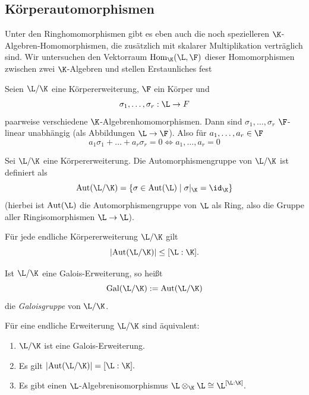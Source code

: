 \documentclass[11pt, a4paper]{article}
\begin{document}
\subsection{Körperautomorphismen}

\begin{note}
    Unter den Ringhomomorphismen gibt es eben auch die noch spezielleren $\K$-Algebren-Homomorphismen, die zusätzlich mit skalarer Multiplikation verträglich sind. Wir untersuchen den Vektorraum $\mathrm{Hom}_\K(\L,\F)$ dieser Homomorphismen zwischen zwei $\K$-Algebren und stellen Erstaunliches fest
\end{note}

\begin{lemma}[Artin] \Theorem
    Seien $\L/\K$ eine Körpererweiterung, $\F$ ein Körper und
    $$\sigma_1, \dots, \sigma_r: \L \to F$$
    paarweise verschiedene $\K$-Algebrenhomomorphismen. Dann sind $\sigma_1,\dots,\sigma_r$ $\F$-linear unabhängig (als Abbildungen $\L\to \F$). Also für $a_1,\dots , a_r\in \F$
    $$a_1\sigma_1+\dots +a_r\sigma_r = 0 \iff a_1,\dots , a_r=0 $$
\end{lemma}

\begin{definition}[Automorphismengruppe] \Theorem
    Sei $\L/\K$ eine Körpererweiterung. Die Automorphismengruppe von $\L/\K$ ist definiert als
    $$\mathrm{Aut}(\L/\K) = \{\sigma \in \mathrm{Aut}(\L) \mid \sigma|_\K = \id_\K\}$$
    (hierbei ist $\mathrm{Aut}(\L)$ die Automorphismengruppe von $\L$ als Ring, also die Gruppe aller Ringisomorphismen $\L \to \L$).
\end{definition}

\begin{corollary}
    Für jede endliche Körpererweiterung $\L/\K$ gilt
    $$|\mathrm{Aut}(\L/\K)| \leq [\L:\K].$$
\end{corollary}


\begin{definition}[Galoisgruppe] \Theorem
    Ist $\L/\K$ eine Galois-Erweiterung, so heißt
    $$\mathrm{Gal}(\L/\K) := \mathrm{Aut}(\L/\K)$$
    die \emph{Galoisgruppe} von $\L/\K$.
\end{definition}

\begin{theorem} \Theorem
    Für eine endliche Erweiterung $\L/\K$ sind äquivalent:
    \begin{enumerate}[label=(\roman*)]
        \item $\L/\K$ ist eine Galois-Erweiterung.
        \item Es gilt
        $|\mathrm{Aut}(\L/\K)| = [\L:\K].$
        \item Es gibt einen $\L$-Algebrenisomorphismus
        $\L \otimes_\K \L \cong \L^{[\L:\K]}.$
    \end{enumerate}
\end{theorem}
\end{document}
